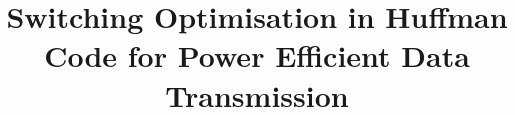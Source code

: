 \documentclass[preprint,12pt]{elsarticle}
\begin{document}
\begin{frontmatter}



\title{Switching Optimisation in Huffman Code for Power Efficient   Data Transmission }


\author{}

\address{}

\begin{abstract}


\end{abstract}
\end{frontmatter}
\end{document}
